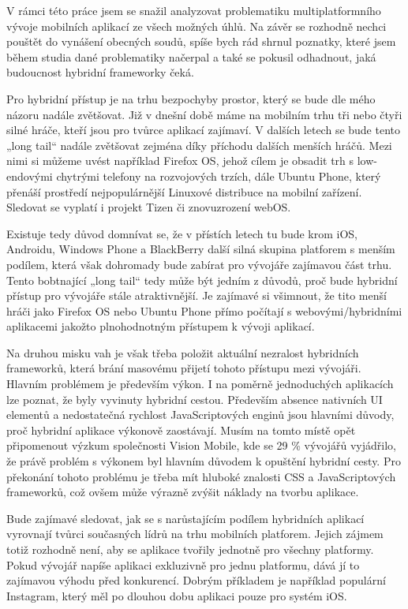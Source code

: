 V rámci této práce jsem se snažil analyzovat problematiku multiplatformního vývoje mobilních aplikací ze všech možných úhlů. Na závěr se rozhodně nechci pouštět do vynášení obecných soudů, spíše bych rád shrnul poznatky, které jsem během studia dané problematiky načerpal a také se pokusil odhadnout, jaká budoucnost hybridní frameworky čeká.


Pro hybridní přístup je na trhu bezpochyby prostor, který se bude dle mého názoru nadále zvětšovat. Již v dnešní době máme na mobilním trhu tři nebo čtyři silné hráče, kteří jsou pro tvůrce aplikací zajímaví. V dalších letech se bude tento „long tail“ nadále zvětšovat zejména díky příchodu dalších menších hráčů. Mezi nimi si můžeme uvést například Firefox OS, jehož cílem je obsadit trh s low-endovými chytrými telefony na rozvojových trzích, dále Ubuntu Phone, který přenáší prostředí nejpopulárnější Linuxové distribuce na mobilní zařízení. Sledovat se vyplatí i projekt Tizen či znovuzrození webOS. 


Existuje tedy důvod domnívat se, že v přístích letech tu bude krom iOS, Androidu, Windows Phone a BlackBerry další silná skupina platforem s menším podílem, která však dohromady bude zabírat pro vývojáře zajímavou část trhu. Tento bobtnající „long tail“ tedy může být jedním z důvodů, proč bude hybridní přístup pro vývojáře stále atraktivnější. Je zajímavé si všimnout, že tito menší hráči jako Firefox OS nebo Ubuntu Phone přímo počítají s webovými/hybridními aplikacemi jakožto plnohodnotným přístupem k vývoji aplikací.


Na druhou misku vah je však třeba položit aktuální nezralost hybridních frameworků, která brání masovému přijetí tohoto přístupu mezi vývojáři. Hlavním problémem je především výkon. I na poměrně jednoduchých aplikacích lze poznat, že byly vyvinuty hybridní cestou. Především absence nativních UI elementů a nedostatečná rychlost JavaScriptových enginů jsou hlavními důvody, proč hybridní aplikace výkonově zaostávají. Musím na tomto místě opět připomenout výzkum společnosti Vision Mobile, kde se 29 \% vývojářů vyjádřilo, že právě problém s výkonem byl hlavním důvodem k opuštění hybridní cesty. Pro překonání tohoto problému je třeba mít hluboké znalosti CSS a JavaScriptových frameworků, což ovšem může výrazně zvýšit náklady na tvorbu aplikace.


Bude zajímavé sledovat, jak se s narůstajícím podílem hybridních aplikací vyrovnají tvůrci současných lídrů na trhu mobilních platforem. Jejich zájmem totiž rozhodně není, aby se aplikace tvořily jednotně pro všechny platformy. Pokud vývojář napíše aplikaci exkluzivně pro jednu platformu, dává jí to zajímavou výhodu před konkurencí. Dobrým příkladem je například populární Instagram, který měl po dlouhou dobu aplikaci pouze pro systém iOS. 


